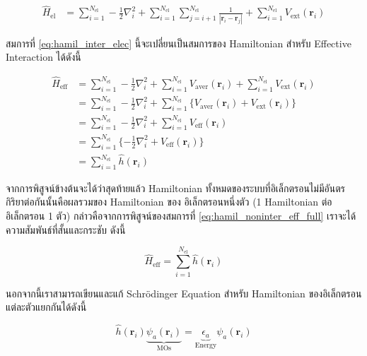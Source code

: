 \begin{align}\label{eq:hamil_inter_elec}
    \hat{H}_{\text{el}} & = \sum^{N_{\text{el}}}_{i=1} -\frac{1}{2} \nabla^{2}_{i}
    + \sum^{N_{\text{el}}}_{i=1} \sum^{N_{\text{el}}}_{j=i+1} \frac{1}{|\bm{r}_{i}-\bm{r}_{j}|}
    + \sum^{N_{\text{el}}}_{i=1} V_{\text{ext}}(\bm{r}_{i})
\end{align}

\noindent สมการที่ \eqref{eq:hamil_inter_elec} นี้จะเปลี่ยนเป็นสมการของ Hamiltonian สำหรับ Effective Interaction ได้ดังนี้

\begin{align}\label{eq:hamil_noninter_eff_full}
    \hat{H}_{\text{eff}} & = \sum^{N_{\text{el}}}_{i=1} -\frac{1}{2} \nabla^{2}_{i}
    + \sum^{N_{\text{el}}}_{i=1} V_{\text{aver}}(\bm{r}_{i})
    + \sum^{N_{\text{el}}}_{i=1} V_{\text{ext}}(\bm{r}_{i}) \nonumber                                                            \\
                         & = \sum^{N_{\text{el}}}_{i=1} -\frac{1}{2} \nabla^{2}_{i}
    + \sum^{N_{\text{el}}}_{i=1} \{ V_{\text{aver}}(\bm{r}_{i}) + V_{\text{ext}}(\bm{r}_{i}) \} \nonumber                        \\
                         & = \sum^{N_{\text{el}}}_{i=1} -\frac{1}{2} \nabla^{2}_{i}
    + \sum^{N_{\text{el}}}_{i=1} V_{\text{eff}}(\bm{r}_{i}) \nonumber                                                            \\
                         & = \sum^{N_{\text{el}}}_{i=1} \{ -\frac{1}{2} \nabla^{2}_{i} + V_{\text{eff}}(\bm{r}_{i}) \} \nonumber \\
                         & = \sum^{N_{\text{el}}}_{i=1} \hat{h}(\bm{r}_{i})
\end{align}

จากการพิสูจน์ข้างต้นจะได้ว่าสุดท้ายแล้ว Hamiltonian ทั้งหมดของระบบที่อิเล็กตรอนไม่มีอันตรกิริยาต่อกันนั้นคือผลรวมของ Hamiltonian ของ%
อิเล็กตรอนหนึ่งตัว (1 Hamiltonian ต่ออิเล็กตรอน 1 ตัว) กล่าวคือจากการพิสูจน์ของสมการที่ \eqref{eq:hamil_noninter_eff_full}
เราจะได้ความสัมพันธ์ที่สั้นและกระชับ ดังนี้

\begin{equation}\label{eq:hamil_noninter_eff}
    \hat{H}_{\text{eff}} = \sum^{N_{\text{el}}}_{i=1} \hat{h}(\bm{r}_{i})
\end{equation}

นอกจากนี้เราสามารถเขียนและแก้ Schr\"{o}dinger Equation สำหรับ Hamiltonian ของอิเล็กตรอนแต่ละตัวแยกกันได้ดังนี้

\begin{equation}\label{eq:hamil_one_elec_mo}
    \hat{h}(\bm{r}_{i}) \underbrace{\psi_{a}(\bm{r}_{i})}_{\text{MOs}} =
    \underbrace{\epsilon_{a}}_{\text{Energy}} \psi_{a}(\bm{r}_{i})
\end{equation}

